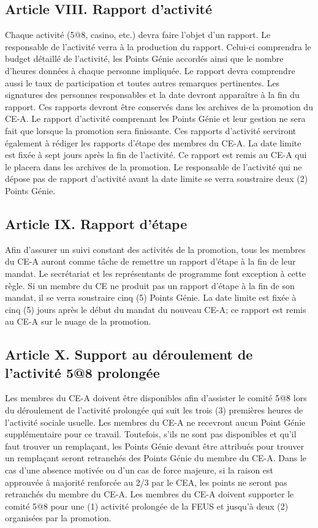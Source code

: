 \subsection*{Article VIII. Rapport d'activité}
Chaque activité (5@8, casino, etc.) devra faire l'objet d'un rapport. Le responsable de l'activité verra à la production du rapport. Celui-ci comprendra le budget détaillé de l'activité, les Points Génie accordés ainsi que le nombre d'heures données à chaque personne impliquée. Le rapport devra comprendre aussi le taux de participation et toutes autres remarques pertinentes. Les signatures des personnes responsables et la date devront apparaître à la fin du rapport. Ces rapports devront être conservés dans les archives de la promotion du CE-A. Le rapport d’activité comprenant les Points Génie et leur gestion ne sera fait que lorsque la promotion sera finissante. Ces rapports d’activité serviront également à rédiger les rapports d’étape des membres du CE-A. La date limite est fixée à sept jours après la fin de l’activité. Ce rapport est remis au CE-A qui le placera dans les archives de la promotion. Le responsable de l’activité qui ne dépose pas de rapport d’activité avant la date limite se verra soustraire deux (2) Points Génie.

\subsection*{Article IX. Rapport d'étape}
Afin d'assurer un suivi constant des activités de la promotion, tous les membres du CE-A auront comme tâche de remettre un rapport d'étape à la fin de leur mandat. Le secrétariat et les représentants de programme font exception à cette règle. Si un membre du CE ne produit pas un rapport d’étape à la fin de son mandat, il se verra soustraire cinq (5) Points Génie. La date limite est fixée à cinq (5) jours après le début du mandat du nouveau CE-A; ce rapport est remis au CE-A sur le nuage de la promotion.  

\subsection*{Article X. Support au déroulement de l'activité 5@8 prolongée}
Les membres du CE-A doivent être disponibles afin d’assister le comité 5@8 lors du déroulement de l’activité prolongée qui suit les trois (3) premières heures de l’activité sociale usuelle. Les membres du CE-A ne recevront aucun Point Génie supplémentaire pour ce travail. Toutefois, s’ils ne sont pas disponibles et qu'il faut trouver un remplaçant, les Points Génie devant être attribués pour trouver un remplaçant seront retranchés des Points Génie du membre du CE-A. Dans le cas d’une absence motivée ou d’un cas de force majeure, si la raison est approuvée à majorité renforcée au 2/3 par le CEA, les points ne seront pas retranchés du membre du CE-A. Les membres du CE-A doivent supporter le comité 5@8 pour une (1) activité prolongée de la FEUS et jusqu'à deux (2) organisées par la promotion. 